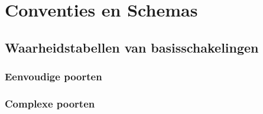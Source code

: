\chapter{Conventies en Schemas}

\section{Waarheidstabellen van basisschakelingen}
\subsection{Eenvoudige poorten}
\subsection{Complexe poorten}



